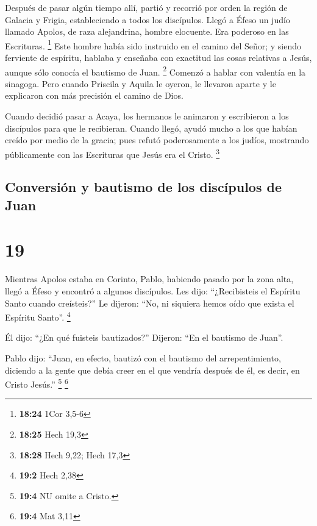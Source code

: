  Después de pasar algún tiempo allí, partió y recorrió
por orden la región de Galacia y Frigia, estableciendo a todos los
discípulos.  Llegó a Éfeso un judío llamado Apolos, de
raza alejandrina, hombre elocuente. Era poderoso en las Escrituras.
\footnote{\textbf{18:24} 1Cor 3,5-6}  Este hombre había
sido instruido en el camino del Señor; y siendo ferviente de espíritu,
hablaba y enseñaba con exactitud las cosas relativas a Jesús, aunque
sólo conocía el bautismo de Juan. \footnote{\textbf{18:25} Hech 19,3}
 Comenzó a hablar con valentía en la sinagoga. Pero
cuando Priscila y Aquila le oyeron, le llevaron aparte y le explicaron
con más precisión el camino de Dios.

 Cuando decidió pasar a Acaya, los hermanos le animaron y
escribieron a los discípulos para que le recibieran. Cuando llegó, ayudó
mucho a los que habían creído por medio de la gracia; 
pues refutó poderosamente a los judíos, mostrando públicamente con las
Escrituras que Jesús era el Cristo. \footnote{\textbf{18:28} Hech 9,22;
  Hech 17,3}

\hypertarget{conversiuxf3n-y-bautismo-de-los-discuxedpulos-de-juan}{%
\subsection{Conversión y bautismo de los discípulos de
Juan}\label{conversiuxf3n-y-bautismo-de-los-discuxedpulos-de-juan}}

\hypertarget{section-18}{%
\section{19}\label{section-18}}

 Mientras Apolos estaba en Corinto, Pablo, habiendo pasado
por la zona alta, llegó a Éfeso y encontró a algunos discípulos.
 Les dijo: ``¿Recibisteis el Espíritu Santo cuando
creísteis?'' Le dijeron: ``No, ni siquiera hemos oído que exista el
Espíritu Santo''. \footnote{\textbf{19:2} Hech 2,38}

 Él dijo: ``¿En qué fuisteis bautizados?'' Dijeron: ``En
el bautismo de Juan''.

 Pablo dijo: ``Juan, en efecto, bautizó con el bautismo
del arrepentimiento, diciendo a la gente que debía creer en el que
vendría después de él, es decir, en Cristo Jesús.'' \footnote{\textbf{19:4}
  NU omite a Cristo.} \footnote{\textbf{19:4} Mat 3,11}

